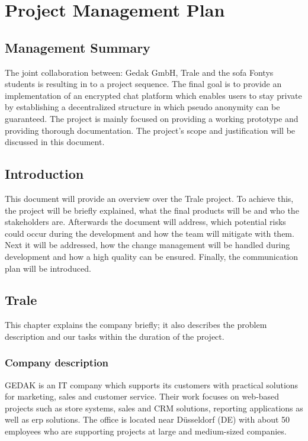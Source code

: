 \section{Project Management Plan}\label{sec:project-management-plan}

\subsection{Management Summary}\label{subsec:management-summary}

The joint collaboration between: Gedak GmbH, Trale and the \ac{sofa} Fontys students is resulting in to a project
sequence.
The final goal is to provide an implementation of an encrypted chat platform which enables users to stay private by
establishing a decentralized structure in which pseudo anonymity can be guaranteed.
The project is mainly focused on providing a working prototype and providing thorough documentation.
The project's scope and justification will be discussed in this document.

\subsection{Introduction}\label{subsec:introduction}
This document will provide an overview over the Trale project.
To achieve this, the project will be briefly explained, what the final products will be and who the stakeholders are.
Afterwards the document will address, which potential risks could occur during the development and how the team will
mitigate with them.
Next it will be addressed, how the change management will be handled during development and how a high quality can be
ensured.
Finally, the communication plan will be introduced.

\subsection{Trale}\label{subsec:trale}

This chapter explains the company briefly;
it also describes the problem description and our tasks within the duration of the project.

\subsubsection{Company description}

GEDAK is an IT company which supports its customers with practical solutions for marketing, sales and customer service.
Their work focuses on web-based projects such as store systems, sales and CRM solutions, reporting applications as well
as \ac{erp} solutions.
The office is located near D\"usseldorf (DE) with about 50 employees who are supporting projects at large and
medium-sized companies.


